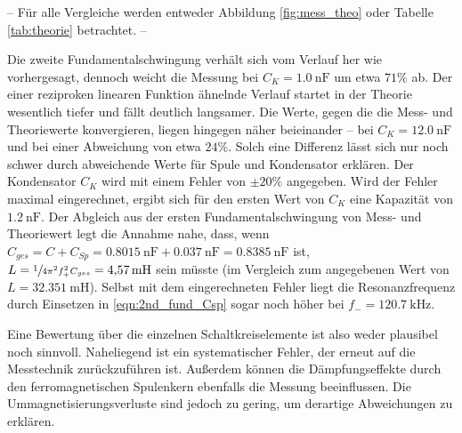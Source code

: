 -- Für alle Vergleiche werden entweder Abbildung \ref{fig:mess_theo} oder Tabelle \ref{tab:theorie} betrachtet. --

Die zweite %
Fundamentalschwingung verhält sich vom Verlauf her wie vorhergesagt, dennoch weicht die Messung bei $C_K = \SI{1.0}{\nano\farad}$ um etwa $71\%$ ab.
Der %
einer reziproken linearen Funktion ähnelnde Verlauf startet in der Theorie wesentlich tiefer und fällt deutlich langsamer. 
Die Werte, gegen die die Mess- und Theoriewerte konvergieren, liegen hingegen näher beieinander -- bei $C_K = \SI{12.0}{\nano\farad}$
und bei einer Abweichung von etwa $24\%$.
Solch eine Differenz lässt sich nur noch schwer durch abweichende Werte für Spule und Kondensator erklären. Der Kondensator $C_K$ wird mit einem Fehler von $\pm20\%$ angegeben.
Wird der Fehler maximal eingerechnet, ergibt sich für den ersten Wert von $C_K$ eine Kapazität von $\SI{1.2}{\nano\farad}$. 
Der Abgleich aus der ersten Fundamentalschwingung von Mess- und Theoriewert legt die Annahme nahe, dass, wenn ${C_{ges} = C + C_{Sp} = \SI{0.8015}{\nano\farad} + \SI{0.037}{\nano\farad} = \SI{0.8385}{\nano\farad}}$ 
ist, 
$L = \sfrac{1}{4\pi^2f_+^2C_{ges}} = \SI{4.57}{\milli\henry}$ sein müsste (im Vergleich zum angegebenen Wert von $L = \SI{32.351}{\milli\henry}$).
Selbst mit dem eingerechneten Fehler liegt die Resonanzfrequenz durch Einsetzen in \eqref{eqn:2nd_fund_Csp} sogar noch höher bei $f_- = \SI{120.7}{\kilo\hertz}$.

Eine Bewertung über die einzelnen Schaltkreiselemente ist also weder plausibel noch sinnvoll. Naheliegend ist ein systematischer Fehler, der erneut auf die Messtechnik zurückzuführen ist.
Außerdem können die Dämpfungseffekte durch den %
ferromagnetischen Spulenkern ebenfalls die Messung beeinflussen. Die Ummagnetisierungsverluste sind jedoch zu gering, um derartige Abweichungen zu erklären.

